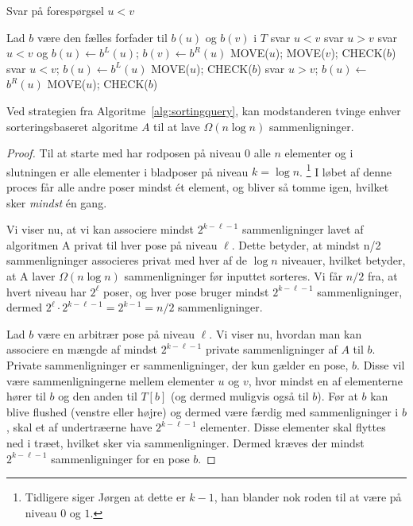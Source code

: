 \begin{algorithm}
	\caption{\label{alg:sortingquery} Svar på forespørgsel $u < v$}
	\begin{algorithmic}[1]
		\STATE Lad $b$ være den fælles forfader til $b(u)$ og $b(v)$ i $T$
		\STATE svar $u < v$
		\ELSE
		\STATE svar $u > v$
		\ENDIF
		\ELSE
		\STATE {}
		\STATE svar $u < v$ og $b(u) \gets b^L(u)$; $b(v) \gets b^R(u)$
		\STATE MOVE($u$); MOVE($v$); CHECK($b$)
		\STATE svar $u < v$; $b(u) \gets b^L(u)$
		\STATE MOVE($u$); CHECK($b$)
		\ELSE
		\STATE svar $u > v$; $b(u) \gets $ $b^R(u)$
		\STATE MOVE($u$); CHECK($b$)
		\ENDIF
		\ENDIF
	\end{algorithmic}
\end{algorithm}

\begin{theorem}
	Ved strategien fra Algoritme~\ref{alg:sortingquery}, kan modstanderen tvinge enhver sorteringsbaseret algoritme $A$ til at lave $\Omega(n \log n)$ sammenligninger.
\end{theorem}
\begin{proof}
	Til at starte med har rodposen på niveau $0$ alle $n$ elementer og i slutningen er alle elementer i bladposer på niveau $k = \log n$. \footnote{Tidligere siger Jørgen at dette er $k-1$, han blander nok roden til at være på niveau $0$ og $1$.} I løbet af denne proces får alle andre poser mindst ét element, og bliver så tomme igen, hvilket sker \textit{mindst} én gang.

	Vi viser nu, at vi kan associere mindst $2^{k-\ell-1}$ sammenligninger lavet af algoritmen A privat til hver pose på niveau \(\ell\). Dette betyder, at mindst n/2 sammenligninger associeres privat med hver af de \(\log n\) niveauer, hvilket betyder, at A laver \(\Omega(n \log n)\) sammenligninger før inputtet sorteres. Vi får \(n/2\) fra, at hvert niveau har \(2^{\ell}\) poser, og hver pose bruger mindst \(2^{k-\ell-1}\) sammenligninger, dermed \(2^{\ell} \cdot 2^{k-\ell-1} = 2^{k-1} = n/2\) sammenligninger.

	Lad \( b \) være en arbitrær pose på niveau \( \ell \). Vi viser nu, hvordan man kan associere en mængde af mindst \( 2^{k-\ell-1} \) private sammenligninger af \( A \) til \( b \). Private sammenligninger er sammenligninger, der kun gælder en pose, \( b \). Disse vil være sammenligningerne mellem elementer \( u \) og \( v \), hvor mindst en af elementerne hører til \( b \) og den anden til \( T[b] \) (og dermed muligvis også til \( b \)). Før at \( b \) kan blive flushed (venstre eller højre) og dermed være færdig med sammenligninger i \( b \), skal et af undertræerne have \( 2^{k-\ell-1} \) elementer. Disse elementer skal flyttes ned i træet, hvilket sker via sammenligninger. Dermed kræves der mindst \( 2^{k-\ell-1} \) sammenligninger for en pose \( b \).
\end{proof}

